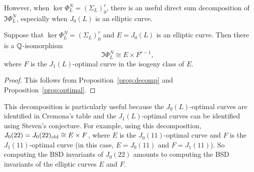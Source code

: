 However, when $\ker\Phi_L ^N = (\Sigma_L)_0 ^r$, there is an useful direct sum
decomposition of $\Im\Phi_L ^N$, especially when $J_0(L)$ is an elliptic curve.

\begin{corollary}
    \label{cor:elliptic_decomp}
    Suppose that $\ker\Phi_L ^N = (\Sigma_L)_0 ^r$ and $E=J_0(L)$ is an elliptic
    curve. Then there is a $\mathbb{Q}$-isomorphism
    \[
        \Im\Phi_L ^N \cong E \times F^{r-1},
    \]
    where $F$ is the $J_1(L)$-optimal curve in the isogeny class of $E$.
\end{corollary}
\begin{proof}
    This follows from Proposition~\ref{prop:decomp} and
    Proposition~\ref{prop:optimal}.
\end{proof}

This decomposition is particularly useful because the $J_0(L)$-optimal curves
are identified in Cremona's table and the $J_1(L)$-optimal curves can be
identified using Steven's conjecture. For example, using this decomposition,
$J_0(22) = J_0(22)_{\mathrm{old}} \cong E\times F$, where $E$ is the $J_0(11)$-optimal
curve and $F$ is the $J_1(11)$-optimal curve (in this case, $E=J_0(11)$ and
$F=J_1(11)$). So computing the BSD invariants of $J_0(22)$ amounts to computing
the BSD invariants of the elliptic curves $E$ and $F$.


